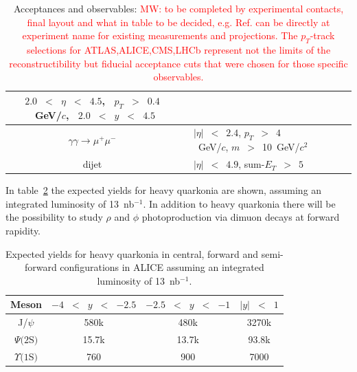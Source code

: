\documentclass[../report.tex]{subfiles}
\begin{document}
\begin{table}[htbp]
{\begin{tabular}{|c|c|c|c|l|c|c|c|c|}
          &
          $2.0$~$<$~$\eta$~$<$~$4.5$,~
          $p_T$~$>$~$0.4$~GeV/$c$,~
          $2.0$~$<$~$y$~$<$~$4.5$
          \\
          \hline
              {\multirow{2}{*}{ATLAS}} &
              $\gamma\gamma\to \mu^+\mu^-$ &
              {\multirow{2}{*}{PbPb}} &
              {\multirow{2}{*}{\cite{ATLAS:2016vdy}}} &
              $|\eta|$~$<$~$2.4$,
              $p_T$~$>$~$4$~GeV/$c$,
              $m$~$>$~10~GeV/$c^2$
              \\
              &
              dijet &
              &
              &
              $|\eta|$~$<$~$4.9$,
              sum-$E_T$~$>$~$5$
              \\
              \hline
    \end{tabular}
    \caption{Acceptances and observables: \textcolor{red}{MW: to be completed by experimental contacts, final layout and what in table to be decided, e.g. Ref. can be directly at experiment name for existing measurements and projections. The $p_T$-track selections for ATLAS,ALICE,CMS,LHCb represent not the limits of the reconstructibility but fiducial acceptance cuts that were chosen for those specific observables.}  }
    \label{tab:UPCExpRun12}
  }
\end{table}


In table~\ref{tab:ALICERun34Proj} the expected yields for heavy
quarkonia are shown, assuming an integrated luminosity of
13~nb$^{-1}$. In addition to heavy quarkonia there will be the
possibility to study $\rho$ and $\phi$ photoproduction via dimuon
decays at forward rapidity.

\begin{table}[htbp]
  {%
    \centering
    \begin{tabular}{|c|c|c|c|}
      \hline
      Meson & $-4$~$<$~$y$~$<$~$-2.5$ & $-2.5$~$<$~$y$~$<$~$-1$ & $|y|$~$<$~$1$\\\hline
      J/$\psi$         & 580k   & 480k   & 3270k   \\
      $\Psi(2$S$)$     &  15.7k &  13.7k &   93.8k \\
      $\Upsilon(1$S$)$ & 760    & 900    & 7000    \\
      \hline
    \end{tabular}
    \caption{Expected yields for heavy quarkonia in central, forward and semi-forward configurations in ALICE
      assuming an integrated luminosity of 13~nb$^{-1}$.} \label{tab:ALICERun34Proj}
  }
\end{table}
\end{document}
